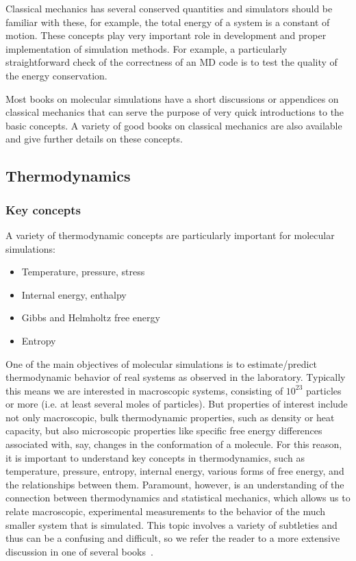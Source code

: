 \documentclass[9pt,bestpractices]{livecoms}
\begin{document}
Classical mechanics has several conserved quantities and simulators should be familiar with these, for example, the total energy of a system is a constant of motion.
These concepts play very important role in development and proper implementation of simulation methods.
For example, a particularly straightforward check of the correctness of an MD code is to test the quality of the energy conservation.

Most books on molecular simulations have a short discussions or appendices on classical mechanics that can serve the purpose of very quick introductions to the basic concepts.
A variety of good books on classical mechanics are also available and give further details on these concepts.

\subsection{Thermodynamics}
\label{sec:thermodynamics}

\subsubsection{Key concepts}
A variety of thermodynamic concepts are particularly important for molecular simulations:
\begin{itemize}
\item Temperature, pressure, stress
\item Internal energy, enthalpy
\item Gibbs and Helmholtz free energy
\item Entropy
\end{itemize}

One of the main objectives of molecular simulations is to estimate/predict thermodynamic behavior of real systems as observed in the laboratory.
Typically this means we are interested in macroscopic systems, consisting of $10^23$ particles or more (i.e. at least several moles of particles). 
But properties of interest include not only macroscopic, bulk thermodynamic properties, such as density or heat capacity,
but also microscopic properties like specific free energy differences associated with, say, changes in the conformation of a molecule.
For this reason, it is important to understand key concepts in thermodynamics, such as temperature, pressure, entropy, internal energy, various forms of free energy, and the relationships between them.
Paramount, however, is an understanding of the connection between thermodynamics and statistical mechanics, which allows us to relate macroscopic, experimental measurements to the behavior of the much smaller system that is simulated.
This topic involves a variety of subtleties and thus can be a confusing and difficult, so we refer the reader to a more extensive discussion in one of several books~\cite{ShellBook, DillBook}.
\end{document}
